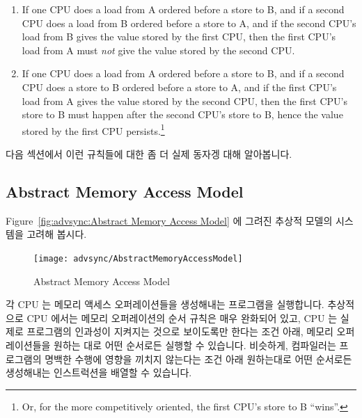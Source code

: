 \begin{enumerate}
\item	If one CPU does a load from A ordered before a store to B,
	and if a second CPU does a load from B ordered before a store to A,
	and if the second CPU's load from B gives the value stored by
	the first CPU, then the first CPU's load from A must \emph{not}
	give the value stored by the second CPU.
\item	If one CPU does a load from A ordered before a store to B,
	and if a second CPU does a store to B ordered before a
	store to A, and if the first CPU's load from A gives
	the value stored by the second CPU, then the first CPU's
	store to B must happen after the second CPU's store to B,
	hence the value stored by the first CPU persists.\footnote{
		Or, for the more competitively oriented, the first
		CPU's store to B ``wins''.}
\fi
\end{enumerate}

다음 섹션에서 이런 규칙들에 대한 좀 더 실제 동자겡 대해 알아봅니다.

\subsection{Abstract Memory Access Model}

Figure~\ref{fig:advsync:Abstract Memory Access Model} 에 그려진 추상적 모델의
시스템을 고려해 봅시다.

\begin{figure}[htb]
\begin{center}
\texttt{[image: advsync/AbstractMemoryAccessModel]}
\end{center}
\caption{Abstract Memory Access Model}
\end{figure}

각 CPU 는 메모리 액세스 오퍼레이션들을 생성해내는 프로그램을 실행합니다.
추상적으로 CPU 에서는 메모리 오퍼레이션의 순서 규칙은 매우 완화되어 있고, CPU
는 실제로 프로그램의 인과성이 지켜지는 것으로 보이도록만 한다는 조건 아래,
메모리 오퍼레이션들을 원하는 대로 어떤 순서로든 실행할 수 있습니다.
비슷하게, 컴파일러는 프로그램의 명백한 수행에 영향을 끼치지 않는다는 조건 아래
원하는대로 어떤 순서로든 생성해내는 인스트럭션을 배열할 수 있습니다.

